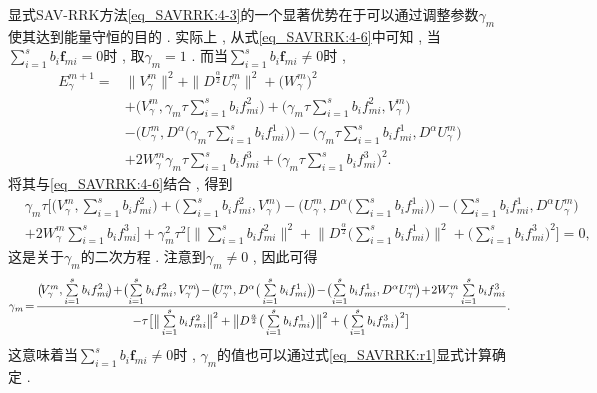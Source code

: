 显式SAV-RRK方法\eqref{eq_SAVRRK:4-3}的一个显著优势在于可以通过调整参数$\gamma_m$ 使其达到能量守恒的目的 . 
实际上 , 从式\eqref{eq_SAVRRK:4-6}中可知 , 当$\sum\limits_{i=1}^s b_i \bm{f}_{m i}=0$时 , 取$\gamma_m=1$ . 
而当$\sum\limits_{i=1}^s b_i \bm{f}_{m i}\neq 0$时 , 
\begin{align}
E_{\gamma}^{m+1}  = & \|V_{\gamma}^{m}\|^2+\|D^\frac{\alpha}{2} U_{\gamma}^{m}\|^2+\big(W_{\gamma}^{m}\big)^2 \nonumber\\
& + \big(V_{\gamma}^{m} , \gamma_m\tau\sum\limits_{i=1}^{s}b_if_{mi}^2\big)+\big(\gamma_m\tau\sum\limits_{i=1}^{s}b_if_{mi}^2 , V_{\gamma}^{m}\big)\nonumber\\
&-\big(U_{\gamma}^{m} , D^{\alpha}\big(\gamma_m\tau\sum\limits_{i=1}^{s}b_if_{mi}^1\big)\big)-\big(\gamma_m\tau\sum\limits_{i=1}^{s}b_if_{mi}^1 , D^{\alpha} U_{\gamma}^{m}\big)\nonumber\\
&+2W_{\gamma}^{m}\gamma_m\tau\sum\limits_{i=1}^{s}b_if_{mi}^3+\big(\gamma_m\tau\sum\limits_{i=1}^{s}b_if_{mi}^3\big)^2 . \label{eq_SAVRRK:49}
\end{align}
将其与\eqref{eq_SAVRRK:4-6}结合 , 得到
\begin{align*}
&\gamma_m\tau\big[\big(V_{\gamma}^{m} , \sum\limits_{i=1}^{s}b_if_{mi}^2\big)+\big(\sum\limits_{i=1}^{s}b_if_{mi}^2 , V_{\gamma}^{m}\big)-\big(U_{\gamma}^{m} , D^{\alpha}\big(\sum\limits_{i=1}^{s}b_if_{mi}^1\big)\big)-\big(\sum\limits_{i=1}^{s}b_if_{mi}^1 , D^{\alpha} U_{\gamma}^{m}\big)\\
&+2W_{\gamma}^{m}\sum\limits_{i=1}^{s}b_if_{mi}^3\big] +\gamma_m^2\tau^2\big[\big\|\sum\limits_{i=1}^{s}b_if_{mi}^2\big\|^2+ \big\|D^\frac{\alpha}{2}\big(\sum\limits_{i=1}^{s}b_if_{mi}^1\big)\big\|^2+\big(\sum\limits_{i=1}^{s}b_if_{mi}^3\big)^2\big]=0 , 
\end{align*}
这是关于$\gamma_m$的二次方程 . 注意到$\gamma_m\neq 0$ , 因此可得
\begin{equation}\label{eq_SAVRRK:r1}\small
\gamma_m \!=\! \frac{\big(\!V_{\gamma}^{m} , \sum\limits_{i=1}^{s}b_if_{mi}^2\!\big)\!+\!\big(\!\sum\limits_{i=1}^{s}b_if_{mi}^2 , V_{\gamma}^{m}\!\big)\!-\!\big(\!U_{\gamma}^{m} , D^{\alpha}\big(\sum\limits_{i=1}^{s}b_if_{mi}^1\big)\!\big)\!-\!\big(\!\sum\limits_{i=1}^{s}b_if_{mi}^1 , D^{\alpha} U_{\gamma}^{m}\!\big)\!+\!2W_{\gamma}^{m}\sum\limits_{i=1}^{s}b_if_{mi}^3}{-\tau\big[\big\|\sum\limits_{i=1}^{s}b_if_{mi}^2\big\|^2+\big\|D^\frac{\alpha}{2}\big(\sum\limits_{i=1}^{s}b_if_{mi}^1\big)\big\|^2+\big(\sum\limits_{i=1}^{s}b_if_{mi}^3\big)^2\big]}  . 
\end{equation}
这意味着当$\sum\limits_{i=1}^s b_i \bm{f}_{m i}\neq 0$时 , $\gamma_m$的值也可以通过式\eqref{eq_SAVRRK:r1}显式计算确定 . 

